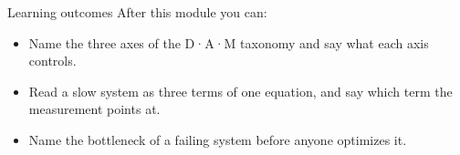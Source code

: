 \begin{frame}{Learning outcomes}
  After this module you can:
  \begin{itemize}
    \item Name the three axes of the D·A·M taxonomy and say what each axis
          controls.
    \item Read a slow system as three terms of one equation, and say which
          term the measurement points at.
    \item Name the bottleneck of a failing system before anyone optimizes it.
  \end{itemize}
\end{frame}